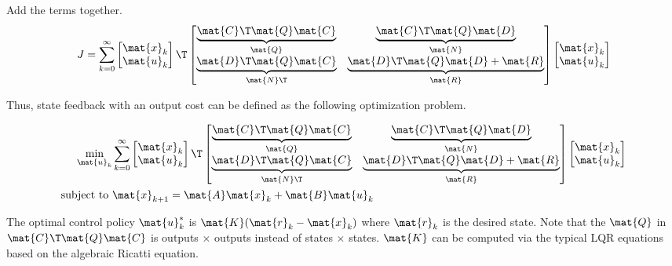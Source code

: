 Add the terms together.
\begin{equation}
  J = \sum_{k=0}^\infty
  \begin{bmatrix}
    \mat{x}_k \\
    \mat{u}_k
  \end{bmatrix}\T
  \begin{bmatrix}
    \underbrace{\mat{C}\T\mat{Q}\mat{C}}_{\mat{Q}} &
    \underbrace{\mat{C}\T\mat{Q}\mat{D}}_{\mat{N}} \\
    \underbrace{\mat{D}\T\mat{Q}\mat{C}}_{\mat{N}\T} &
    \underbrace{\mat{D}\T\mat{Q}\mat{D} + \mat{R}}_{\mat{R}}
  \end{bmatrix}
  \begin{bmatrix}
    \mat{x}_k \\
    \mat{u}_k
  \end{bmatrix}
\end{equation}

Thus, state feedback with an output cost can be defined as the following
optimization problem.
\begin{theorem}
  \begin{align}
    \min_{\mat{u}_k} &\sum_{k=0}^\infty
    \begin{bmatrix}
      \mat{x}_k \\
      \mat{u}_k
    \end{bmatrix}\T
    \begin{bmatrix}
      \underbrace{\mat{C}\T\mat{Q}\mat{C}}_{\mat{Q}} &
      \underbrace{\mat{C}\T\mat{Q}\mat{D}}_{\mat{N}} \\
      \underbrace{\mat{D}\T\mat{Q}\mat{C}}_{\mat{N}\T} &
      \underbrace{\mat{D}\T\mat{Q}\mat{D} + \mat{R}}_{\mat{R}}
    \end{bmatrix}
    \begin{bmatrix}
      \mat{x}_k \\
      \mat{u}_k
    \end{bmatrix}
    \nonumber \\
    \text{subject to } &\mat{x}_{k+1} = \mat{A}\mat{x}_k + \mat{B}\mat{u}_k
  \end{align}

  The optimal control policy $\mat{u}_k^*$ is $\mat{K}(\mat{r}_k - \mat{x}_k)$
  where $\mat{r}_k$ is the desired state. Note that the $\mat{Q}$ in
  $\mat{C}\T\mat{Q}\mat{C}$ is outputs $\times$ outputs instead of states
  $\times$ states. $\mat{K}$ can be computed via the typical LQR equations based
  on the algebraic Ricatti equation.
\end{theorem}


